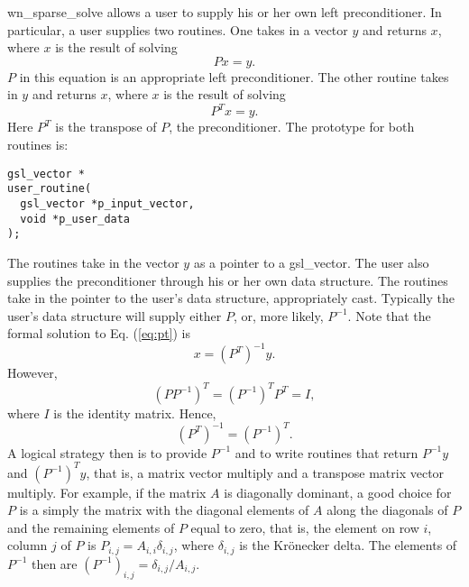 \documentclass{article}    %
\begin{document}
wn\_sparse\_solve allows a user to supply his or her own left preconditioner.
In particular, a user supplies two routines.  One takes in a vector $y$ and
returns $x$, where $x$ is the result of solving
\begin{equation}
P x = y.
\end{equation}
$P$ in this equation is an appropriate left preconditioner.
The other routine takes in $y$ and returns $x$, where $x$ is the result of
solving
\begin{equation}
P^T x = y.
\label{eq:pt}
\end{equation}
Here $P^T$ is the transpose of $P$, the preconditioner.
The prototype for both routines is:
\begin{verbatim}
gsl_vector *
user_routine(
  gsl_vector *p_input_vector,
  void *p_user_data
);
\end{verbatim}
The routines take in the vector $y$ as a pointer to a gsl\_vector.
The user also supplies the preconditioner through his or her own data
structure.  The routines take in the pointer to the user's data structure,
appropriately cast.  Typically the user's data structure will supply either
$P$, or, more likely, $P^{-1}$.  Note that the formal solution to
Eq. (\ref{eq:pt}) is
\begin{equation}
x = \left(P^T\right)^{-1} y.
\end{equation}
However,
\begin{equation}
\left( P P^{-1} \right )^T = \left( P^{-1} \right )^T P^T = I,
\end{equation}
where $I$ is the identity matrix.  Hence,
\begin{equation}
\left( P^T \right )^{-1} = \left( P^{-1} \right )^T.
\end{equation}
A logical strategy then is to provide $P^{-1}$ and to write routines that
return $P^{-1} y$ and $\left(P^{-1}\right)^T y$, that is, a matrix vector
multiply and a transpose matrix vector multiply.  For example, if the
matrix $A$ is diagonally dominant, a good choice for $P$ is a simply the
matrix with the diagonal elements of $A$ along the diagonals of $P$ and
the remaining elements of $P$ equal to zero, that is, the element
on row $i$, column $j$ of $P$ is $P_{i,j} = A_{i,i}\delta_{i,j}$, where
$\delta_{i,j}$ is the Kr\"onecker delta.  The elements of $P^{-1}$ then are
$\left(P^{-1}\right)_{i,j} = \delta_{i,j} / A_{i,j}$.
\end{document}
